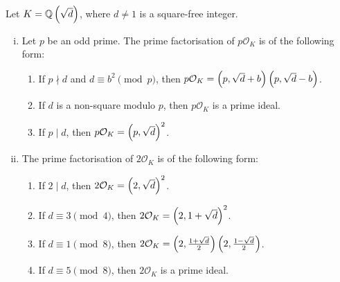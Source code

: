 
\begin{izrek}
Let $K = \mathbb{Q} \left(\sqrt{d}\right)$, where $d \ne 1$ is a square-free
integer.

\begin{enumerate}[i)]
\item Let $p$ be an odd prime. The prime factorisation of
$p \mathcal{O}_K$ is of the following form:

\begin{enumerate}
\item If $p \nmid d$ and $d \equiv b^2 \pmod{p}$, then
$p \mathcal{O}_K = \left(p, \sqrt{d}+b\right) \left(p, \sqrt{d}-b\right)$.
\item If $d$ is a non-square modulo $p$, then $p \mathcal{O}_K$ is
a prime ideal.
\item If $p \mid d$, then
$p \mathcal{O}_K = \left(p, \sqrt{d}\right)^2$.
\end{enumerate}

\item The prime factorisation of $2 \mathcal{O}_K$ is of the
following form:

\begin{enumerate}
\item If $2 \mid d$, then $2 \mathcal{O}_K = \left(2, \sqrt{d}\right)^2$.
\item If $d \equiv 3 \pmod{4}$, then
$2 \mathcal{O}_K = \left(2, 1+\sqrt{d}\right)^2$.
\item If $d \equiv 1 \pmod{8}$, then
$2 \mathcal{O}_K =
\left(2, \frac{1+\sqrt{d}}{2}\right) \left(2, \frac{1-\sqrt{d}}{2}\right)$.
\item If $d \equiv 5 \pmod{8}$, then $2 \mathcal{O}_K$ is a prime
ideal.
\end{enumerate}
\end{enumerate}
\end{izrek}

